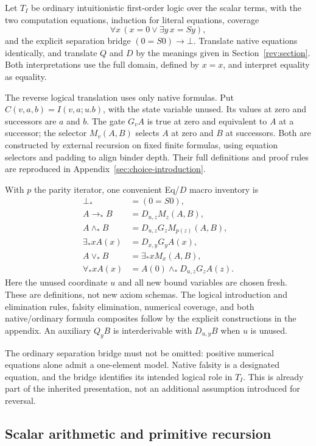 \documentclass[11pt,letterpaper]{article}
\theoremstyle{definition}\newtheorem{definition}[theorem]{Definition}
\theoremstyle{remark}\newtheorem{remark}[theorem]{Remark}
\begin{document}
Let $T_I$ be ordinary intuitionistic first-order logic over the scalar
terms, with the two computation equations, induction for literal
equations, coverage
\[
  \forall x\,(x=0\vee\exists y\,x=Sy),
\]
and the explicit separation bridge $(0=S0)\to\bot$. Translate native
equations identically, and translate $Q$ and $D$ by the meanings given
in Section~\ref{rev:section}. Both interpretations use the full domain,
defined by $x=x$, and interpret equality as equality.

The reverse logical translation uses only native formulas. Put
$C(v,a,b)=I(v,a;u.b)$, with the state variable unused. Its values at zero
and successors are $a$ and $b$. The gate $G_vA$ is true at zero and
equivalent to $A$ at a successor; the selector $M_v(A,B)$ selects $A$
at zero and $B$ at successors. Both are constructed by external
recursion on fixed finite formulas, using equation selectors and
padding to align binder depth. Their full definitions and proof rules
are reproduced in Appendix~\ref{sec:choice-introduction}.

With $p$ the parity iterator, one convenient Eq/$D$ macro inventory is
\[
\begin{aligned}
 \bot_*&=(0=S0),\\
 A\to_*B&=D_{u,z}M_z(A,B),\\
 A\land_*B&=D_{u,z}G_zM_{p(z)}(A,B),\\
 \exists_*x A(x)&=D_{x,y}G_yA(x),\\
 A\lor_*B&=\exists_*x M_x(A,B),\\
 \forall_*x A(x)&=A(0)\land_*D_{u,z}G_zA(z).
\end{aligned}
\]
Here the unused coordinate $u$ and all new bound variables are chosen
fresh. These are definitions, not new axiom schemas. The logical
introduction and elimination rules, falsity elimination, numerical
coverage, and both native/ordinary formula composites follow by the
explicit constructions in the appendix. An auxiliary $Q_yB$ is
interderivable with $D_{u,y}B$ when $u$ is unused.

The ordinary separation bridge must not be omitted: positive numerical
equations alone admit a one-element model. Native falsity is a designated
equation, and the bridge identifies its intended logical role in $T_I$.
This is already part of the inherited presentation, not an additional
assumption introduced for reversal.

\subsection{Scalar arithmetic and primitive recursion}
\end{document}
